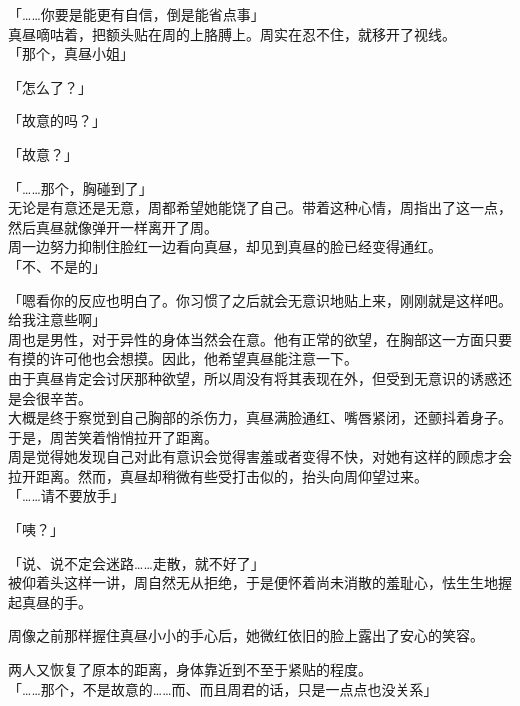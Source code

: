 「……你要是能更有自信，倒是能省点事」\\

真昼嘀咕着，把额头贴在周的上胳膊上。周实在忍不住，就移开了视线。\\

「那个，真昼小姐」

「怎么了？」

「故意的吗？」

「故意？」

「……那个，胸碰到了」\\

无论是有意还是无意，周都希望她能饶了自己。带着这种心情，周指出了这一点，然后真昼就像弹开一样离开了周。\\

周一边努力抑制住脸红一边看向真昼，却见到真昼的脸已经变得通红。\\

「不、不是的」

「嗯看你的反应也明白了。你习惯了之后就会无意识地贴上来，刚刚就是这样吧。给我注意些啊」\\

周也是男性，对于异性的身体当然会在意。他有正常的欲望，在胸部这一方面只要有摸的许可他也会想摸。因此，他希望真昼能注意一下。\\

由于真昼肯定会讨厌那种欲望，所以周没有将其表现在外，但受到无意识的诱惑还是会很辛苦。\\

大概是终于察觉到自己胸部的杀伤力，真昼满脸通红、嘴唇紧闭，还颤抖着身子。于是，周苦笑着悄悄拉开了距离。\\

周是觉得她发现自己对此有意识会觉得害羞或者变得不快，对她有这样的顾虑才会拉开距离。然而，真昼却稍微有些受打击似的，抬头向周仰望过来。\\

「……请不要放手」

「咦？」

「说、说不定会迷路……走散，就不好了」\\

被仰着头这样一讲，周自然无从拒绝，于是便怀着尚未消散的羞耻心，怯生生地握起真昼的手。

周像之前那样握住真昼小小的手心后，她微红依旧的脸上露出了安心的笑容。

两人又恢复了原本的距离，身体靠近到不至于紧贴的程度。\\

「……那个，不是故意的……而、而且周君的话，只是一点点也没关系」

